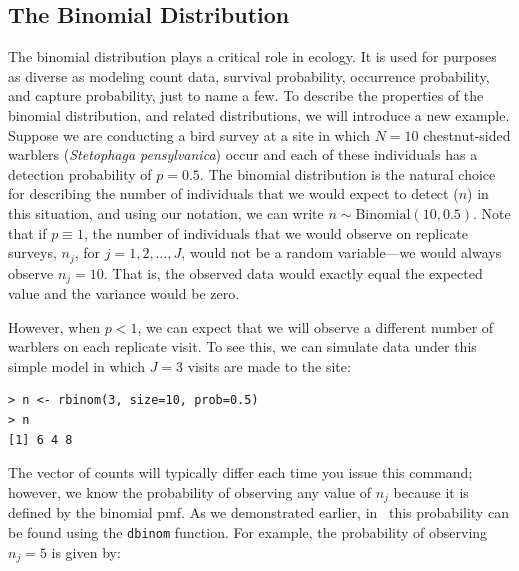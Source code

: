 \subsection{The Binomial Distribution}

The binomial distribution plays a critical role in ecology. It is
used for purposes as diverse as modeling count data, survival
probability, occurrence probability, and capture probability, just to
name a few.
To describe the properties of the binomial distribution, and related
distributions, we will introduce a new example.
Suppose we are conducting a bird survey at a site in which $N=10$
chestnut-sided warblers (\textit{Stetophaga pensylvanica}) occur and
each of these individuals has a detection probability of $p=0.5$. The
binomial distribution is the natural choice for describing the number
of individuals that we would expect to detect ($n$) in this
situation, and using our notation, we can write
$n \sim \text{Binomial}(10, 0.5)$. Note that if $p \equiv 1$, the number of
individuals that we would observe on replicate surveys, $n_j$, for
$j=1,2,\dots,J$,
would not be a random variable---we would always observe
$n_j=10$. That is, the observed data would exactly equal the expected
value and the variance would be zero.

However, when $p<1$, we can expect that we will observe %
a different number of warblers on each replicate visit. To see this,
we can simulate data under this simple model in which $J=3$ visits are
made to the site:
\begin{verbatim}
> n <- rbinom(3, size=10, prob=0.5)
> n
[1] 6 4 8
\end{verbatim}
The vector of counts will typically differ each time you issue this
command; however, we know the probability of observing any value of
$n_j$ because it is defined by the binomial pmf. As we demonstrated
earlier, in \R~this probability can be found using the \verb+dbinom+
function. For example, the probability of observing $n_j=5$ is given by:

